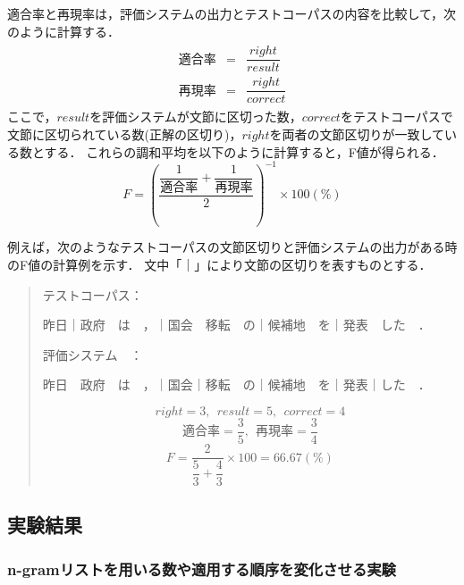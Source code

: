適合率と再現率は，評価システムの出力とテストコーパスの内容を比較して，次のように計算する．
\begin{eqnarray}\label{eq:Eval}
  \begin{array}{rcl}
    適合率 & = & \dfrac{right}{result}\\[4mm]
    再現率 & = & \dfrac{right}{correct}
  \end{array}
\end{eqnarray}
ここで，$result$を評価システムが文節に区切った数，$correct$をテストコーパスで文節に区切られている数(正解の区切り)，$right$を両者の文節区切りが一致している数とする．
これらの調和平均を以下のように計算すると，F値が得られる．
\begin{displaymath}
  F = \left(\dfrac{\dfrac{1}{適合率}+\dfrac{1}{再現率}}{2}\right)^{-1}\times100(\%)
\end{displaymath}

例えば，次のようなテストコーパスの文節区切りと評価システムの出力がある時のF値の計算例を示す．
文中「｜」により文節の区切りを表すものとする．

\begin{quote}
  {\bold テストコーパス}：

  \hspace{10mm}昨日｜政府　は　，｜国会　移転　の｜候補地　を｜発表　した　．

  {\bold 評価システム}　：

  \hspace{10mm}昨日　政府　は　，｜国会｜移転　の｜候補地　を｜発表｜した　．

  \begin{displaymath}
    right=3,~~result=5,~~correct=4
  \end{displaymath}
  \begin{displaymath}
    適合率=\dfrac{3}{5},~~再現率=\dfrac{3}{4}
  \end{displaymath}
  \begin{displaymath}
    F=\dfrac{2}{\dfrac{5}{3}+\dfrac{4}{3}}\times100=66.67(\%)
  \end{displaymath}
\end{quote}


\subsection{実験結果}\label{subsec:実験結果}

\subsubsection{n-gramリストを用いる数や適用する順序を変化させる実験}\label{subsubsec:n-gramの数}


